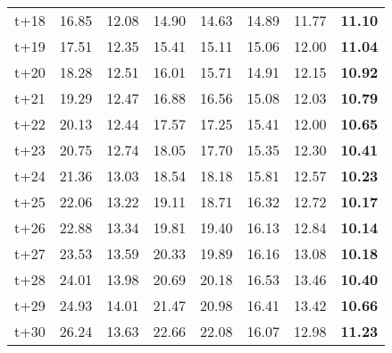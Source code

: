 \begin{table}[H]
\begin{tabular}{lrrrrrrr}
t+18  & 16.85  & 12.08  & 14.90  & 14.63  & 14.89  & 11.77  & \textbf{11.10}  \\
t+19  & 17.51  & 12.35  & 15.41  & 15.11  & 15.06  & 12.00  & \textbf{11.04}  \\
t+20  & 18.28  & 12.51  & 16.01  & 15.71  & 14.91  & 12.15  & \textbf{10.92}  \\
t+21  & 19.29  & 12.47  & 16.88  & 16.56  & 15.08  & 12.03  & \textbf{10.79}  \\
t+22  & 20.13  & 12.44  & 17.57  & 17.25  & 15.41  & 12.00  & \textbf{10.65}  \\
t+23  & 20.75  & 12.74  & 18.05  & 17.70  & 15.35  & 12.30  & \textbf{10.41}  \\
t+24  & 21.36  & 13.03  & 18.54  & 18.18  & 15.81  & 12.57  & \textbf{10.23}  \\
t+25  & 22.06  & 13.22  & 19.11  & 18.71  & 16.32  & 12.72  & \textbf{10.17}  \\
t+26  & 22.88  & 13.34  & 19.81  & 19.40  & 16.13  & 12.84  & \textbf{10.14}  \\
t+27  & 23.53  & 13.59  & 20.33  & 19.89  & 16.16  & 13.08  & \textbf{10.18}  \\
t+28  & 24.01  & 13.98  & 20.69  & 20.18  & 16.53  & 13.46  & \textbf{10.40}  \\
t+29  & 24.93  & 14.01  & 21.47  & 20.98  & 16.41  & 13.42  & \textbf{10.66}  \\
t+30  & 26.24  & 13.63  & 22.66  & 22.08  & 16.07  & 12.98  & \textbf{11.23}  \\

\bottomrule
\end{tabular}
\end{table}
